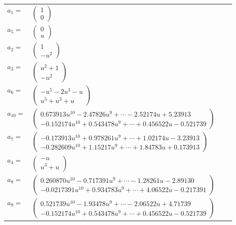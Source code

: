 \documentclass[1p]{elsarticle_modified}
\theoremstyle{definition}
\begin{document}
\begin{tabular}{m{7pt} m{180pt} m{7pt} m{180pt} }
\flushright $a_{1}=$&$\begin{pmatrix}1\\0\end{pmatrix}$ \\
\flushright $a_{5}=$&$\begin{pmatrix}0\\u\end{pmatrix}$ \\
\flushright $a_{2}=$&$\begin{pmatrix}1\\- u^2\end{pmatrix}$ \\
\flushright $a_{3}=$&$\begin{pmatrix}u^2+1\\- u^2\end{pmatrix}$ \\
\flushright $a_{6}=$&$\begin{pmatrix}- u^5-2 u^3- u\\u^5+u^3+u\end{pmatrix}$ \\
\flushright $a_{10}=$&$\begin{pmatrix}0.673913 u^{10}-2.47826 u^{9}+\cdots-2.52174 u+5.23913\\-0.152174 u^{10}+0.543478 u^{9}+\cdots+0.456522 u-0.521739\end{pmatrix}$ \\
\flushright $a_{7}=$&$\begin{pmatrix}-0.173913 u^{10}+0.978261 u^{9}+\cdots+1.02174 u-3.23913\\-0.282609 u^{10}+1.15217 u^{9}+\cdots+1.84783 u+0.173913\end{pmatrix}$ \\
\flushright $a_{4}=$&$\begin{pmatrix}- u\\u^3+u\end{pmatrix}$ \\
\flushright $a_{8}=$&$\begin{pmatrix}0.260870 u^{10}-0.717391 u^{9}+\cdots-1.28261 u-2.89130\\-0.0217391 u^{10}+0.934783 u^{9}+\cdots+4.06522 u-0.217391\end{pmatrix}$ \\
\flushright $a_{9}=$&$\begin{pmatrix}0.521739 u^{10}-1.93478 u^{9}+\cdots-2.06522 u+4.71739\\-0.152174 u^{10}+0.543478 u^{9}+\cdots+0.456522 u-0.521739\end{pmatrix}$ \\

\end{tabular}
\end{document}
